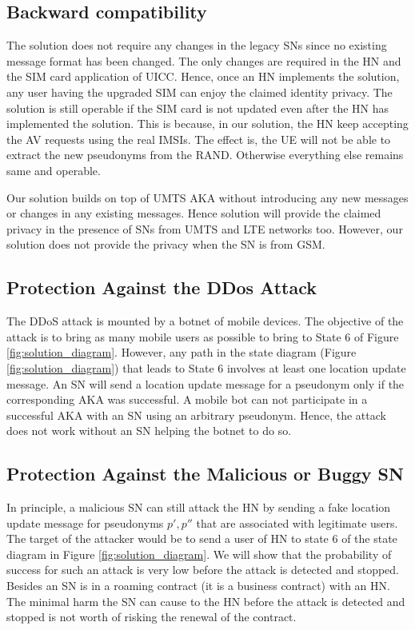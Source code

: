 \documentclass{llncs} %
\begin{document}
\subsection{Backward compatibility} The solution does not require any changes in the legacy SNs since no existing message format has been changed. The only changes are required in the HN and the SIM card application of UICC. Hence, once an HN implements the solution, any user having the upgraded SIM can enjoy the claimed identity privacy. The solution is still operable if the SIM card is not updated even after the HN has implemented the solution. This is because, in our solution, the HN keep accepting the AV requests using the real IMSIs. The effect is, the UE will not be able to extract the new pseudonyms from the RAND. Otherwise everything else remains same and operable. 

Our solution builds on top of UMTS AKA without introducing any new messages or changes in any existing messages. Hence solution will provide the claimed privacy in the presence of SNs from UMTS and LTE networks too. However, our solution does not provide the privacy when the SN is from GSM.

\subsection{Protection Against the DDos Attack} The DDoS attack is mounted by a botnet of mobile devices. The objective of the attack is to bring as many mobile users as possible to bring to State $6$ of Figure \ref{fig:solution_diagram}. However, any path in the state diagram (Figure \ref{fig:solution_diagram}) that leads to State $6$ involves at least one location update message. An SN will send a location update message for a pseudonym only if the corresponding AKA was successful. A mobile bot can not participate in a successful AKA with an SN using an arbitrary pseudonym. Hence, the attack does not work without an SN helping the botnet to do so.


\subsection{Protection Against the Malicious or Buggy SN}
In principle, a malicious SN can still attack the HN by sending a fake location update message for pseudonyms $p',p''$ that are associated with legitimate users. The target of the attacker would be to send a user of HN to state $6$ of the state diagram in Figure \ref{fig:solution_diagram}. We will show that the probability of success for such an attack is very low before the attack is detected and stopped. Besides an SN is in a roaming contract (it is a business contract) with an HN. The minimal harm the SN can cause to the HN before the attack is detected and stopped is not worth of risking the renewal of the contract.
\end{document}
